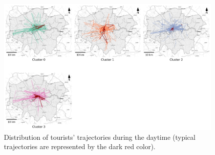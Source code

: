 \documentclass{article}
\theoremstyle{remark}
\begin{document}
\begin{figure}[!h]
\centering
\includegraphics[width=1\textwidth]{figures/traj_distribution_daytime_tourists.png}
\caption{\label{fig:traj_distribution_daytime_tourists}Distribution of tourists' trajectories during the daytime (typical trajectories are represented by the dark red color).}
\end{figure}
\end{document}
